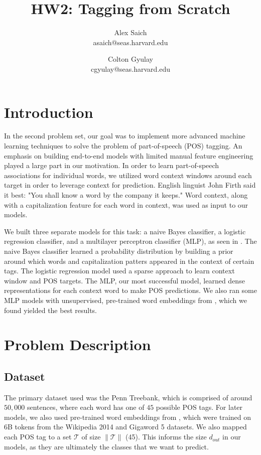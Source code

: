 \documentclass[11pt]{article}
\title{HW2: Tagging from Scratch}
\author{Alex Saich \\ asaich@seas.harvard.edu \and Colton Gyulay \\ cgyulay@seas.harvard.edu }
\begin{document}
\maketitle{}
\section{Introduction}

In the second problem set, our goal was to implement more advanced machine learning techniques to solve the problem of part-of-speech (POS) tagging. An emphasis on building end-to-end models with limited manual feature engineering played a large part in our motivation. In order to learn part-of-speech associations for individual words, we utilized word context windows around each target in order to leverage context for prediction. English linguist John Firth said it best: "You shall know a word by the company it keeps." Word context, along with a capitalization feature for each word in context, was used as input to our models.

We built three separate models for this task: a naive Bayes classifier, a logistic regression classifier, and a multilayer perceptron classifier (MLP), as seen in \cite{collobert2011natural}. The naive Bayes classifier learned a probability distribution by building a prior around which words and capitalization patters appeared in the context of certain tags. The logistic regression model used a sparse approach to learn context window and POS targets. The MLP, our most successful model, learned dense representations for each context word to make POS predictions. We also ran some MLP models with unsupervised, pre-trained word embeddings from \cite{pennington2014glove}, which we found yielded the best results.


\section{Problem Description}

\subsection{Dataset}

The primary dataset used was the Penn Treebank, which is comprised of around $50,000$ sentences, where each word has one of $45$ possible POS tags. For later models, we also used pre-trained word embeddings from \cite{collobert2011natural}, which were trained on 6B tokens from the Wikipedia 2014 and Gigaword 5 datasets. We also mapped each POS tag to a set $\mathcal{T}$ of size $\|\mathcal{T}\|$ (45). This informs the size $d_{out}$ in our models, as they are ultimately the classes that we want to predict.
\end{document}
